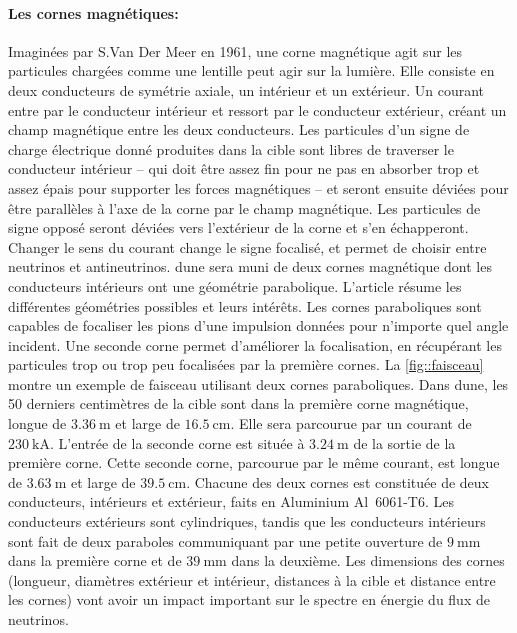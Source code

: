      \paragraph{Les cornes magnétiques:} Imaginées par S.Van Der Meer en 1961\cite{VanDerMeer1961}, une corne magnétique agit sur les particules chargées comme une lentille peut agir sur la lumière. Elle consiste en deux conducteurs de symétrie axiale, un intérieur et un extérieur. Un courant entre par le conducteur intérieur et ressort par le conducteur extérieur, créant un champ magnétique entre les deux conducteurs. Les particules d'un signe de charge électrique donné produites dans la cible sont libres de traverser le conducteur intérieur -- qui doit être assez fin pour ne pas en absorber trop et assez épais pour supporter les forces magnétiques -- et seront ensuite déviées pour être parallèles à l'axe de la corne par le champ magnétique. Les particules de signe opposé seront déviées vers l'extérieur de la corne et s'en échapperont. Changer le sens du courant change le signe focalisé, et permet de choisir entre neutrinos et antineutrinos. \gls{dune} sera muni de deux cornes magnétique dont les conducteurs intérieurs ont une géométrie parabolique. L'article \cite{Kopp2006} résume les différentes géométries possibles et leurs intérêts. Les cornes paraboliques sont capables de focaliser les pions d'une impulsion données pour n'importe quel angle incident. Une seconde corne permet d'améliorer la focalisation, en récupérant les particules trop ou trop peu focalisées par la première cornes. La \autoref{fig::faisceau} montre un exemple de faisceau utilisant deux cornes paraboliques. Dans \gls{dune}, les 50 derniers centimètres de la cible sont dans la première corne magnétique, longue de $\SI{3.36}{\meter}$ et large de $\SI{16.5}{\centi\meter}$. Elle sera parcourue par un courant de $\SI{230}{\kilo\ampere}$. L'entrée de la seconde corne est située à $\SI{3.24}{\meter}$ de la sortie de la première corne. Cette seconde corne, parcourue par le même courant, est longue de  $\SI{3.63}{\meter}$ et large de $\SI{39.5}{\centi\meter}$. Chacune des deux cornes est constituée de deux conducteurs, intérieurs et extérieur, faits en Aluminium Al~6061-T6. Les conducteurs extérieurs sont cylindriques, tandis que les conducteurs intérieurs sont fait de deux paraboles communiquant par une petite ouverture de $\SI{9}{\milli\meter}$ dans la première corne et de $\SI{39}{\milli\meter}$ dans la deuxième. Les dimensions des cornes (longueur, diamètres extérieur et intérieur, distances à la cible et distance entre les cornes) vont avoir un impact important sur le spectre en énergie du flux de neutrinos.
        
